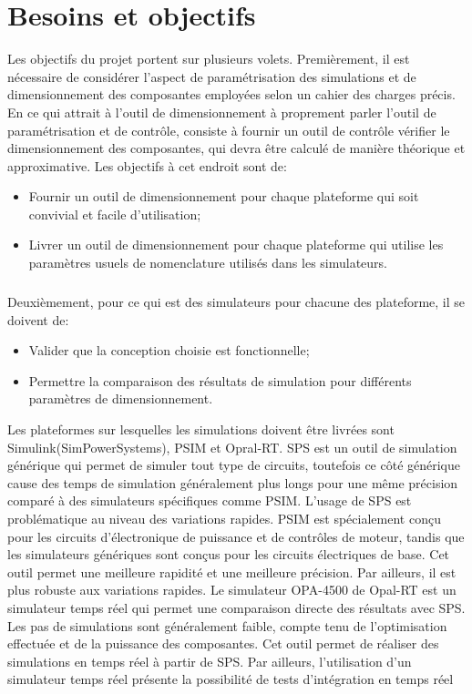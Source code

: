\chapter{Besoins et objectifs}
Les objectifs du projet portent sur plusieurs volets. Premièrement, il est nécessaire de considérer l'aspect de paramétrisation des simulations et de dimensionnement des composantes employées selon un cahier des charges précis. En ce qui attrait à l'outil de dimensionnement à proprement parler l'outil de paramétrisation et de contrôle, consiste à fournir un outil de contrôle vérifier le dimensionnement des composantes, qui devra être calculé de manière théorique et approximative. Les objectifs à cet endroit sont de:

\begin{itemize}
\item Fournir un outil de dimensionnement pour chaque plateforme qui soit convivial et facile d'utilisation;
\item Livrer un outil de dimensionnement pour chaque plateforme qui utilise les paramètres usuels de nomenclature utilisés dans les simulateurs.
\end{itemize}

\paragraph{}Deuxièmement, pour ce qui est des simulateurs pour chacune des plateforme, il se doivent de:
\begin{itemize}
\item Valider que la conception choisie est fonctionnelle;
\item Permettre la comparaison des résultats de simulation pour différents paramètres de dimensionnement.
\end{itemize}
Les plateformes sur lesquelles les simulations doivent être livrées sont Simulink(SimPowerSystems), PSIM et Opral-RT. SPS est un outil de simulation générique qui permet de simuler tout type de circuits, toutefois ce côté générique cause des temps de simulation généralement plus longs pour une même précision comparé à des simulateurs spécifiques comme PSIM. L'usage de SPS est problématique au niveau des variations rapides. PSIM est spécialement conçu pour les circuits d'électronique de puissance et de contrôles de moteur, tandis que les simulateurs génériques sont conçus pour les circuits électriques de base. Cet outil permet une meilleure rapidité et une meilleure précision. Par ailleurs, il est plus robuste aux variations rapides. Le simulateur OPA-4500 de Opal-RT est un simulateur temps réel qui permet une comparaison directe des résultats avec SPS. Les pas de simulations sont généralement faible, compte tenu de l'optimisation effectuée et de la puissance des composantes. Cet outil permet de réaliser des simulations en temps réel à partir de SPS. Par ailleurs, l'utilisation d'un simulateur temps réel présente la possibilité de tests d'intégration en temps réel

